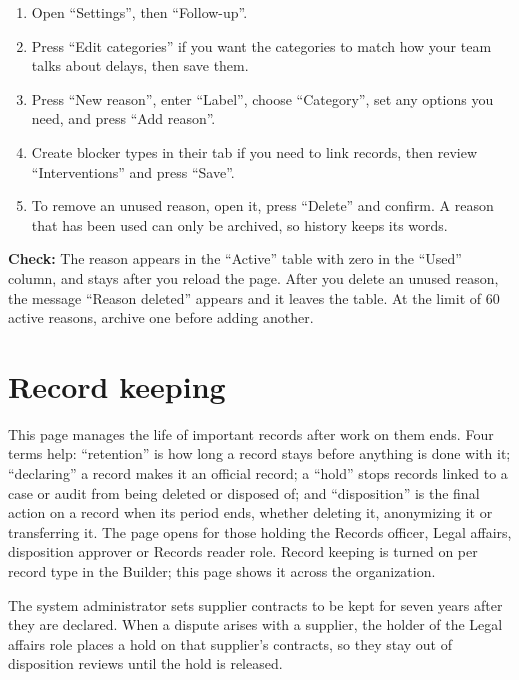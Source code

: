 \begin{enumerate}
\item Open “Settings”, then “Follow-up”.
\item Press “Edit categories” if you want the categories to match how your team talks about delays, then save them.
\item Press “New reason”, enter “Label”, choose “Category”, set any options you need, and press “Add reason”.
\item Create blocker types in their tab if you need to link records, then review “Interventions” and press “Save”.
\item To remove an unused reason, open it, press “Delete” and confirm. A reason that has been used can only be archived, so history keeps its words.
\end{enumerate}

\textbf{Check:} The reason appears in the “Active” table with zero in the “Used” column, and stays after you reload the page. After you delete an unused reason, the message “Reason deleted” appears and it leaves the table. At the limit of 60 active reasons, archive one before adding another.

\section{Record keeping}
\label{sec:settings-feature-record-keeping}

This page manages the life of important records after work on them ends. Four terms help: “retention” is how long a record stays before anything is done with it; “declaring” a record makes it an official record; a “hold” stops records linked to a case or audit from being deleted or disposed of; and “disposition” is the final action on a record when its period ends, whether deleting it, anonymizing it or transferring it. The page opens for those holding the Records officer, Legal affairs, disposition approver or Records reader role. Record keeping is turned on per record type in the Builder; this page shows it across the organization.

\begin{rcnote}
The system administrator sets supplier contracts to be kept for seven years after they are declared. When a dispute arises with a supplier, the holder of the Legal affairs role places a hold on that supplier’s contracts, so they stay out of disposition reviews until the hold is released.
\end{rcnote}

